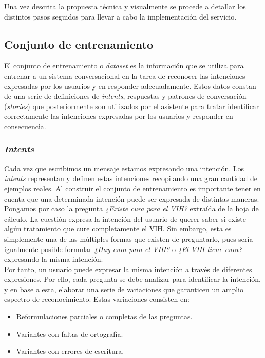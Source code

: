 Una vez descrita la propuesta técnica y visualmente se procede a detallar los distintos pasos seguidos para llevar a cabo la implementación del servicio.\\

\subsection{Conjunto de entrenamiento}
El conjunto de entrenamiento o \textit{dataset} es la información que se utiliza para entrenar a un sistema conversacional en la tarea de reconocer las intenciones expresadas por los usuarios y en responder adecuadamente. Estos datos constan de una serie de definiciones de \textit{intents}, respuestas y patrones de conversación (\textit{stories}) que posteriormente son utilizados por el asistente para tratar identificar correctamente las intenciones expresadas por los usuarios y responder en consecuencia.\\

\subsubsection{\textit{Intents}}
Cada vez que escribimos un mensaje estamos expresando una intención. Los \textit{intents} representan y definen estas intenciones recopilando una gran cantidad de ejemplos reales. Al construir el conjunto de  entrenamiento es importante tener en cuenta que una determinada intención puede ser expresada de distintas maneras. Pongamos por caso la pregunta  \textit{¿Existe cura para el VIH?} extraída de la hoja de cálculo. La cuestión expresa la intención del usuario de querer saber si existe algún tratamiento que cure completamente el VIH. Sin embargo, esta es simplemente una  de las múltiples formas que existen de preguntarlo, pues sería igualmente posible formular \textit{¿Hay cura para el VIH?} o \textit{¿El VIH tiene cura?} expresando la misma intención.\\

Por tanto, un usuario puede expresar la misma intención a través de diferentes expresiones. Por ello, cada pregunta se debe analizar para identificar la intención, y en base a esta, elaborar una serie de variaciones que garanticen un amplio espectro de reconocimiento.
Estas variaciones consisten en:

\begin{itemize}
	\item Reformulaciones parciales o completas de las preguntas.
	\item Variantes con faltas de ortografía.
	\item Variantes con errores de escritura.
\end{itemize}

